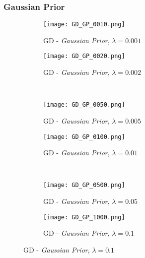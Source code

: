 \documentclass{report}
\begin{document}
			\subsubsection*{Gaussian Prior}
			\begin{figure}[H] \renewcommand\thesubfigure{GD.GP.\arabic{subfigure}}
				\centering
				\begin{subfigure}[b]{0.45\textwidth}
					\texttt{[image: GD\_GP\_0010.png]}
					\caption{GD - \textit{Gaussian Prior}, $\lambda = 0.001$}
					\label{fig:GD_GP001}
				\end{subfigure}
				\begin{subfigure}[b]{0.45\textwidth}
					\texttt{[image: GD\_GP\_0020.png]}
					\caption{GD - \textit{Gaussian Prior}, $\lambda = 0.002$}
					\label{fig:GD_GP002}
				\end{subfigure}
				\\
				\centering
				\begin{subfigure}[b]{0.45\textwidth}
					\texttt{[image: GD\_GP\_0050.png]}
					\caption{GD - \textit{Gaussian Prior}, $\lambda = 0.005$}
					\label{fig:GD_GP005}
				\end{subfigure}
				\begin{subfigure}[b]{0.45\textwidth}
					\texttt{[image: GD\_GP\_0100.png]}
					\caption{GD - \textit{Gaussian Prior}, $\lambda = 0.01$}
					\label{fig:GD_GP01}
				\end{subfigure}
				\\
				\centering
				\begin{subfigure}[b]{0.45\textwidth}
					\texttt{[image: GD\_GP\_0500.png]}
					\caption{GD - \textit{Gaussian Prior}, $\lambda = 0.05$}
					\label{fig:GD_GP05}
				\end{subfigure}
				\begin{subfigure}[b]{0.45\textwidth}
					\texttt{[image: GD\_GP\_1000.png]}
					\caption{GD - \textit{Gaussian Prior}, $\lambda = 0.1$}
					\label{fig:GD_GP1}
				\end{subfigure}
			\end{figure}
\end{document}
